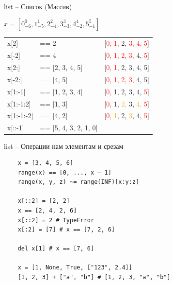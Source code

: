 \documentclass{article}
\begin{document}
\begin{center} list – Список (Массив) \end{center}
{
\Huge
$x = [0_{-6}^{0}, 1_{-5}^{1}, 2_{-4}^{2}, 3_{-3}^{3}, 4_{-2}^{4}, 5_{-1}^{5}]$ \\
\vspace{1cm}
\begin{tabular}{ l l l }
x[2] & == 2 & \hspace{2cm}[\textcolor{red}{0, 1,} 2, \textcolor{red}{3, 4, 5}] \\
x[-2] & == 4 & \hspace{2cm}[\textcolor{red}{0, 1, 2, 3,} 4, \textcolor{red}{5}] \\
x[2:] & == [2, 3, 4, 5] & \hspace{2cm}[\textcolor{red}{0, 1, }2, 3, 4, 5] \\
x[-2:] & == [4, 5] & \hspace{2cm}[\textcolor{red}{0, 1, 2, 3,} 4, 5] \\
x[1:-1] & == [1, 2, 3, 4] & \hspace{2cm}[\textcolor{red}{0,} 1, 2, 3, 4, \textcolor{red}{5}] \\
x[1:-1:2] & == [1, 3] & \hspace{2cm}[\textcolor{red}{0,} 1, \textcolor{orange}{2,} 3, \textcolor{orange}{4,} \textcolor{red}{5}] \\
x[1:-1:-2] & == [4, 2] & \hspace{2cm}[\textcolor{red}{0,} \textcolor{orange}{1}, 2, \textcolor{orange}{3}, 4, \textcolor{red}{5}] \\
x[::-1] & == [5, 4, 3, 2, 1, 0] & \\
\end{tabular}
}
\newpage

\begin{center} list – Операции нам элементам и срезам \end{center}
\vspace{15pt}
\begin{lstlisting}
	x = [3, 4, 5, 6]
	range(x) == [0, ..., x – 1]
	range(x, y, z) ~= range(INF)[x:y:z]

	x[::2] = [2, 2]  
	x == [2, 4, 2, 6]
	x[::2] = 2 # TypeError
	x[:2] = [7] # x == [7, 2, 6]
	
	del x[1] # x == [7, 6]
	
	x = [1, None, True, ["123", 2.4]]
	[1, 2, 3] + ["a", "b"] # [1, 2, 3, "a", "b"]
\end{lstlisting}
\newpage
\end{document}
